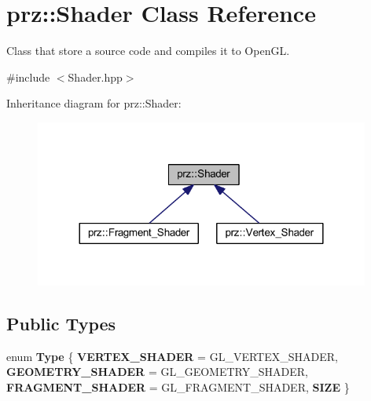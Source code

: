 \hypertarget{classprz_1_1_shader}{}\section{prz\+::Shader Class Reference}
\label{classprz_1_1_shader}


Class that store a source code and compiles it to Open\+GL.  




{\ttfamily \#include $<$Shader.\+hpp$>$}



Inheritance diagram for prz\+::Shader\+:
\nopagebreak
\begin{figure}[H]
\begin{center}
\leavevmode
\includegraphics[width=312pt]{classprz_1_1_shader__inherit__graph}
\end{center}
\end{figure}
\subsection*{Public Types}
\begin{DoxyCompactItemize}
\item 
\mbox{\label{classprz_1_1_shader_a201c45a321469a374e30c5b779476bf6}} 
enum {\bfseries Type} \{ {\bfseries V\+E\+R\+T\+E\+X\+\_\+\+S\+H\+A\+D\+ER} = G\+L\+\_\+\+V\+E\+R\+T\+E\+X\+\_\+\+S\+H\+A\+D\+ER, 
{\bfseries G\+E\+O\+M\+E\+T\+R\+Y\+\_\+\+S\+H\+A\+D\+ER} = G\+L\+\_\+\+G\+E\+O\+M\+E\+T\+R\+Y\+\_\+\+S\+H\+A\+D\+ER, 
{\bfseries F\+R\+A\+G\+M\+E\+N\+T\+\_\+\+S\+H\+A\+D\+ER} = G\+L\+\_\+\+F\+R\+A\+G\+M\+E\+N\+T\+\_\+\+S\+H\+A\+D\+ER, 
{\bfseries S\+I\+ZE}
 \}
\end{DoxyCompactItemize}
